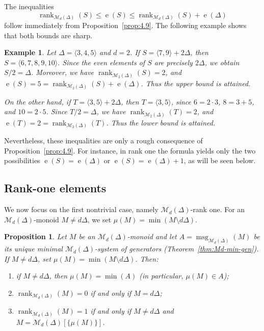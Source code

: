 \documentclass[12pt,a4paper]{amsart}
\newtheorem{proposition}[theorem]{Proposition}
\newtheorem{example}[theorem]{Example}
\theoremstyle{definition}
\theoremstyle{remark}
\begin{document}
The inequalities
\[
\operatorname{rank}_{\mathcal{M}_d(\Delta)}(S)\le \operatorname{e}(S)\le
\operatorname{rank}_{\mathcal{M}_d(\Delta)}(S)+\operatorname{e}(\Delta)
\]
follow immediately from Proposition~\ref{prop:4.9}. The following example shows that both bounds are sharp.

\begin{example}
Let \(\Delta=\langle 3,4,5\rangle\) and \(d=2\). If
\(S=\langle 7,9\rangle+2\Delta\), then
\(S=\langle 6,7,8,9,10\rangle\). Since the even elements of \(S\) are precisely
\(2\Delta\), we obtain \(S/2=\Delta\). Moreover, we have
\(\operatorname{rank}_{\mathcal M_2(\Delta)}(S)=2\), and
\(\operatorname{e}(S)=5=\operatorname{rank}_{\mathcal M_2(\Delta)}(S)+\operatorname{e}(\Delta)\). Thus the upper
bound is attained.

On the other hand, if \(T=\langle 3,5\rangle+2\Delta\), then \(T=\langle 3,5\rangle\),
since \(6=2\cdot 3\), \(8=3+5\), and \(10=2\cdot 5\). Since \(T/2=\Delta\), we have
\(\operatorname{rank}_{\mathcal M_2(\Delta)}(T)=2\), and
\(\operatorname{e}(T)=2=\operatorname{rank}_{\mathcal M_2(\Delta)}(T)\). Thus the lower bound is
attained.
\end{example}

Nevertheless, these inequalities are only a rough consequence of Proposition~\ref{prop:4.9}. For instance, in rank one the formula yields only the two possibilities \(\operatorname{e}(S)=\operatorname{e}(\Delta)\) or \(\operatorname{e}(S)=\operatorname{e}(\Delta)+1\), as will be seen below.

\subsection{Rank-one elements}

We now focus on the first nontrivial case, namely $\mathcal{M}_d(\Delta)$-rank one. For an $\mathcal{M}_d(\Delta)$-monoid $M\neq d\Delta$, we set $\mu(M)=\min(M\setminus d\Delta)$.

\begin{proposition}\label{prop:mu-rank}
Let $M$ be an $\mathcal{M}_d(\Delta)$-monoid and let $A=\operatorname{msg}_{\mathcal{M}_d(\Delta)}(M)$ be its unique minimal $\mathcal{M}_d(\Delta)$-system of generators (Theorem~\ref{thm:Md-min-gen}).
If $M\neq d\Delta$, set $\mu(M)=\min(M\setminus d\Delta)$. Then:
\begin{enumerate}
\item if $M\neq d\Delta$, then $\mu(M)=\min(A)$ (in particular, $\mu(M)\in A$);
\item $\operatorname{rank}_{\mathcal{M}_d(\Delta)}(M)=0$ if and only if $M=d\Delta$;
\item $\operatorname{rank}_{\mathcal{M}_d(\Delta)}(M)=1$ if and only if $M\neq d\Delta$ and $M=\mathcal{M}_d(\Delta)[\{\mu(M)\}]$.
\end{enumerate}
\end{proposition}
\end{document}
